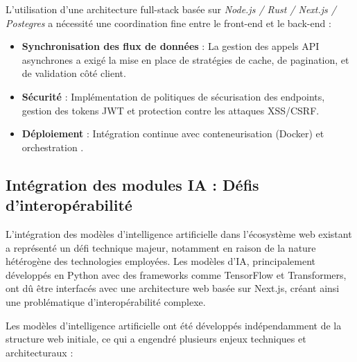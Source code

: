 \documentclass[12pt]{rapportPfe}
\begin{document}
L’utilisation d’une architecture full-stack basée sur \textit{Node.js / Rust / Next.js / Postegres} a nécessité une coordination fine entre le front-end et le back-end :

\begin{itemize}
    \item \textbf{Synchronisation des flux de données} : La gestion des appels API asynchrones a exigé la mise en place de stratégies de cache, de pagination, et de validation côté client.
    \item \textbf{Sécurité} : Implémentation de politiques de sécurisation des endpoints, gestion des tokens JWT et protection contre les attaques XSS/CSRF.
    \item \textbf{Déploiement} : Intégration continue avec conteneurisation (Docker) et orchestration .
\end{itemize}

\subsection{Intégration des modules IA : Défis d'interopérabilité}

L'intégration des modèles d'intelligence artificielle dans l'écosystème web existant a représenté un défi technique majeur, notamment en raison de la nature hétérogène des technologies employées. Les modèles d'IA, principalement développés en Python avec des frameworks comme TensorFlow et Transformers, ont dû être interfacés avec une architecture web basée sur Next.js, créant ainsi une problématique d'interopérabilité complexe.

Les modèles d'intelligence artificielle ont été développés indépendamment de la structure web initiale, ce qui a engendré plusieurs enjeux techniques et architecturaux :
\end{document}
